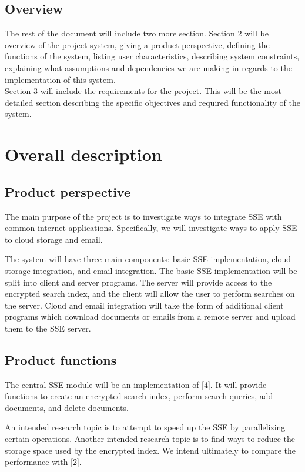 \documentclass[onecolumn, draftclsnofoot,10pt, compsoc]{IEEEtran}
\begin{document}
\subsection{ Overview }
The rest of the document will include two more section. Section 2 will be overview of the project system, giving a product perspective, defining the functions of the system, listing user characteristics,  describing system constraints, explaining what assumptions and dependencies we are making in regards to the implementation of this system. \\
Section 3 will include the requirements for the project. This will be the most detailed section describing the specific objectives and required functionality of the system. 
\section{ Overall description }
\subsection{ Product perspective }

The main purpose of the project is to investigate ways to integrate SSE with common internet applications.
Specifically, we will investigate ways to apply SSE to cloud storage and email.

The system will have three main components: basic SSE implementation, cloud storage integration, and email integration. The basic SSE implementation will be split into client and server programs. The server will provide access to the encrypted search index, and the client will allow the user to perform searches on the server. Cloud and email integration will take the form of additional client programs which download documents or emails from a remote server and upload them to the SSE server.

\subsection{ Product functions }

The central SSE module will be an implementation of [4]. It will provide functions to create an encrypted search index, perform search queries, add documents, and delete documents.

An intended research topic is to attempt to speed up the SSE by parallelizing certain operations. 
Another intended research topic is to find ways to reduce the storage space used by the encrypted index.
We intend ultimately to compare the performance with [2].
\end{document}
